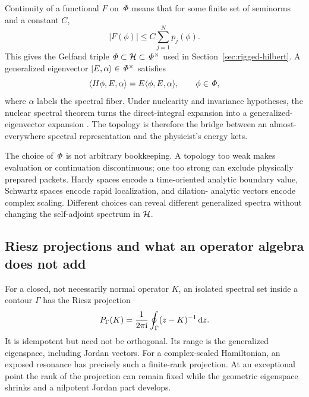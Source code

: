 Continuity of a functional $F$ on $\mathit{\Phi}$ means that for some finite set
of seminorms and a constant $C$,
\begin{equation}
  |F(\phi)|\leq C\sum_{j=1}^N p_j(\phi) .
  \label{eq:functional-continuity-seminorm}
\end{equation}
This gives the Gelfand triple
$\mathit{\Phi}\subset\mathcal{H}\subset\mathit{\Phi}^\times$ used in
Section~\ref{sec:rigged-hilbert}.  A generalized eigenvector
$\lvert E,\alpha \rangle\in\mathit{\Phi}^\times$ satisfies
\begin{equation}
  \langle H\phi,E,\alpha\rangle
  =E\langle \phi,E,\alpha\rangle,
  \qquad \phi\in\mathit{\Phi},
  \label{eq:generalized-eigenvector-preview}
\end{equation}
where $\alpha$ labels the spectral fiber.  Under nuclearity and invariance
hypotheses, the nuclear spectral theorem turns the direct-integral expansion
into a generalized-eigenvector expansion \cite{Gelfand:1964}.  The topology
is therefore the bridge between an almost-everywhere spectral representation
and the physicist's energy kets.

The choice of $\mathit{\Phi}$ is not arbitrary bookkeeping.  A topology too weak
makes evaluation or continuation discontinuous; one too strong can exclude
physically prepared packets.  Hardy spaces encode a time-oriented analytic
boundary value, Schwartz spaces encode rapid localization, and dilation-
analytic vectors encode complex scaling.  Different choices can reveal
different generalized spectra without changing the self-adjoint spectrum in
$\mathcal{H}$.

\subsection{Riesz projections and what an operator algebra does not add}
\label{subsec:riesz-operator-algebra}

For a closed, not necessarily normal operator $K$, an isolated spectral set
inside a contour $\Gamma$ has the Riesz projection
\begin{equation}
  P_\Gamma(K)
  =\frac{1}{2\pi\mathrm{i}}\oint_\Gamma
  (z-K)^{-1}\,\mathrm{d} z .
  \label{eq:riesz-projection-general}
\end{equation}
It is idempotent but need not be orthogonal.  Its range is the generalized
eigenspace, including Jordan vectors.  For a complex-scaled Hamiltonian, an
exposed resonance has precisely such a finite-rank projection.  At an
exceptional point the rank of the projection can remain fixed while the
geometric eigenspace shrinks and a nilpotent Jordan part develops.

